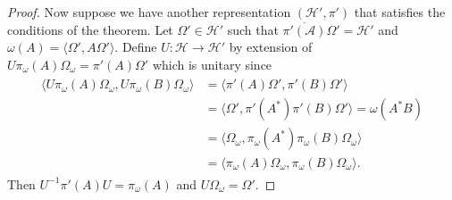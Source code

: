 \begin{proof}
Now suppose we have another representation $(\mathcal{H}', \pi')$ that satisfies the conditions of the theorem. Let $\Omega'\in\mathcal{H}'$ such that $\overline{\pi'(\mathcal{A})}\Omega'=\mathcal{H}'$ and $\omega(A)=\langle \Omega',A\Omega'\rangle$. Define $U:\mathcal{H}\rightarrow \mathcal{H}'$ by extension of $U\pi_\omega(A)\Omega_\omega=\pi'(A)\Omega'$ which is unitary since
\begin{align}
\begin{split}
\langle U\pi_\omega(A)\Omega_\omega,U\pi_\omega(B)\Omega_\omega\rangle&= \langle \pi'(A)\Omega',\pi'(B)\Omega'\rangle \\
&= \langle \Omega',\pi'(A^*)\pi'(B)\Omega'\rangle=\omega(A^*B)\\
&=\langle \Omega_\omega, \pi_\omega(A^*)\pi_\omega(B)\Omega_\omega\rangle \\
&= \langle \pi_\omega(A)\Omega_\omega,\pi_\omega (B)\Omega_\omega\rangle.
\end{split}
\end{align}
Then $U^{-1}\pi'(A)U=\pi_\omega(A)$ and $U\Omega_\omega=\Omega'$.
\end{proof}

